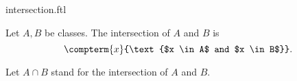 \documentclass{article}
\begin{document}
\begin{smodule}{intersection.ftl}

  \begin{fdefinition*}[label=5744033011859456]
    Let $A, B$ be classes.
    The intersection of $A$ and $B$ is
    \[\compterm{x}{\text{$x \in A$ and $x \in B$}}.\]
  \end{fdefinition*}

  \begin{fconvention*}
    Let $A \cap B$ stand for the intersection of $A$ and $B$.
  \end{fconvention*}
\end{smodule}
\end{document}
